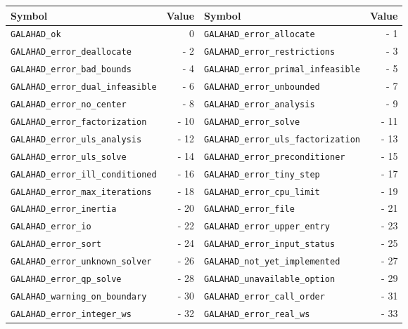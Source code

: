 \documentclass{galahad}
\begin{document}
\begin{figure}[t]
\begin{center}
\begin{tabular}{|l|r||l|r|}
\hline
Symbol                             & Value &
Symbol                             & Value \\
\hline
{\tt GALAHAD\_ok}                        &   0 &
{\tt GALAHAD\_error\_allocate}           & - 1 \\
{\tt GALAHAD\_error\_deallocate}         & - 2 &
{\tt GALAHAD\_error\_restrictions}       & - 3 \\
{\tt GALAHAD\_error\_bad\_bounds}        & - 4 &
{\tt GALAHAD\_error\_primal\_infeasible} & - 5 \\
{\tt GALAHAD\_error\_dual\_infeasible}   & - 6 &
{\tt GALAHAD\_error\_unbounded}          & - 7 \\
{\tt GALAHAD\_error\_no\_center}         & - 8 &
{\tt GALAHAD\_error\_analysis}           & - 9 \\
{\tt GALAHAD\_error\_factorization}      & - 10 &
{\tt GALAHAD\_error\_solve}              & - 11 \\
{\tt GALAHAD\_error\_uls\_analysis}      & - 12 &
{\tt GALAHAD\_error\_uls\_factorization} & - 13 \\
{\tt GALAHAD\_error\_uls\_solve}         & - 14 &
{\tt GALAHAD\_error\_preconditioner}     & - 15 \\
{\tt GALAHAD\_error\_ill\_conditioned}   & - 16 &
{\tt GALAHAD\_error\_tiny\_step}         & - 17 \\
{\tt GALAHAD\_error\_max\_iterations}    & - 18 &
{\tt GALAHAD\_error\_cpu\_limit}         & - 19 \\
{\tt GALAHAD\_error\_inertia}            & - 20 &
{\tt GALAHAD\_error\_file}               & - 21 \\
{\tt GALAHAD\_error\_io}                 & - 22 &
{\tt GALAHAD\_error\_upper\_entry}       & - 23 \\
{\tt GALAHAD\_error\_sort}               & - 24 &
{\tt GALAHAD\_error\_input\_status}      & - 25 \\
{\tt GALAHAD\_error\_unknown\_solver}    & - 26 &
{\tt GALAHAD\_not\_yet\_implemented}     & - 27 \\
{\tt GALAHAD\_error\_qp\_solve}          & - 28 &
{\tt GALAHAD\_unavailable\_option}       & - 29 \\
{\tt GALAHAD\_warning\_on\_boundary}     & - 30 &
{\tt GALAHAD\_error\_call\_order}        & - 31 \\
{\tt GALAHAD\_error\_integer\_ws}        & - 32 &
{\tt GALAHAD\_error\_real\_ws}           & - 33 \\

\end{tabular}
\end{center}
\end{figure}
\end{document}
